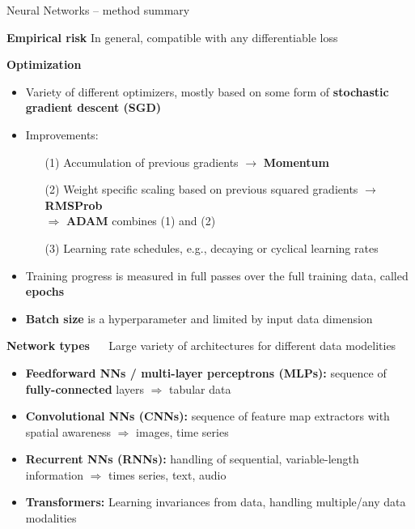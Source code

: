 \documentclass[11pt,compress,t,notes=noshow, xcolor=table]{beamer}
\newcommand{\highlight}[1]{\textcolor{hlcol}{\textbf{#1}}}
\begin{document}
\begin{vbframe}{Neural Networks -- method summary}
  
  \highlight{Empirical risk} In general, compatible with any differentiable loss
  
  \medskip
  
  \highlight{Optimization}
  
  \begin{itemize}
    \item Variety of different optimizers, mostly based on some form of 
    \textbf{stochastic gradient descent (SGD)}\\
    \item Improvements: 
      \begin{itemize}
          \item[(1)] Accumulation of previous gradients $\rightarrow$ \textbf{Momentum}
          \item[(2)] Weight specific scaling based on previous squared gradients $\rightarrow$ \textbf{RMSProb}\\
          $\Rightarrow$ \textbf{ADAM} combines (1) and (2) 
          \item[(3)] Learning rate schedules, e.g., decaying or cyclical learning rates
      \end{itemize}
      \item Training progress is measured in full passes over the full training data, called \textbf{epochs}
      \item \textbf{Batch size} is a hyperparameter and limited by input data dimension
  \end{itemize}

  \framebreak

  \highlight{Network types} ~~ Large variety of architectures for different data modelities
\begin{itemize}
  \item \textbf{Feedforward NNs / multi-layer perceptrons (MLPs):} sequence of 
  \textbf{fully-connected} layers $\Rightarrow$ tabular data
  \item \textbf{Convolutional NNs (CNNs):} sequence of feature map extractors 
  with spatial awareness $\Rightarrow$ images, time series
  \item \textbf{Recurrent NNs (RNNs):} handling of sequential, variable-length 
  information $\Rightarrow$ times series, text, audio
  \item \textbf{Transformers:} Learning invariances from data, handling multiple/any data modalities
\end{itemize}


\end{vbframe}
\end{document}
